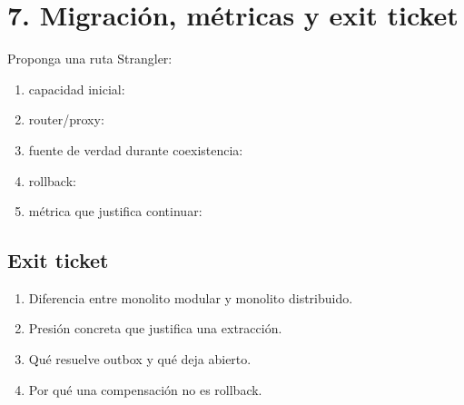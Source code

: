 \documentclass[variant=guia,cover=institutional,mode=print]{ua-engineering-v6-article}
\begin{document}
\newpage
\section{7. Migración, métricas y exit ticket}
Proponga una ruta Strangler:
\begin{enumerate}
\item capacidad inicial: \hrulefill
\item router/proxy: \hrulefill
\item fuente de verdad durante coexistencia: \hrulefill
\item rollback: \hrulefill
\item métrica que justifica continuar: \hrulefill
\end{enumerate}

\subsection*{Exit ticket}
\begin{enumerate}
\item Diferencia entre monolito modular y monolito distribuido.
\item Presión concreta que justifica una extracción.
\item Qué resuelve outbox y qué deja abierto.
\item Por qué una compensación no es rollback.
\end{enumerate}
\end{document}
